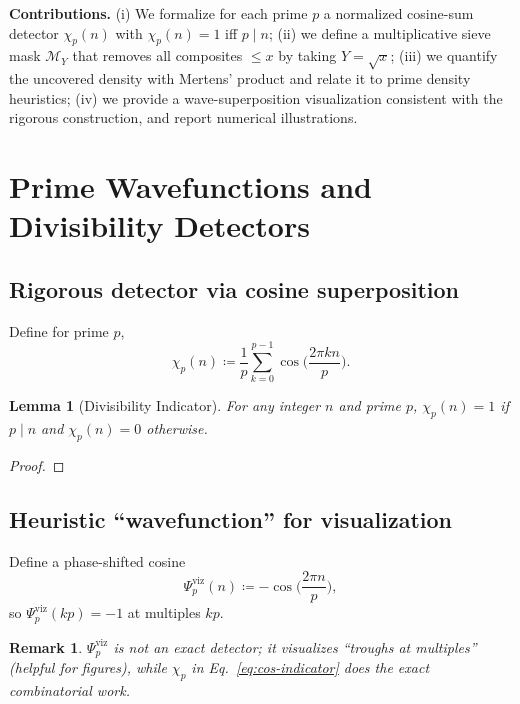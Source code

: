 \documentclass[reprint,amsmath,amssymb,aps,pra]{revtex4-2}
\newtheorem{lemma}{Lemma}
\newtheorem{remark}{Remark}
\newcommand{\W}{\Psi}                         %
\begin{document}
\textbf{Contributions.} (i) We formalize for each prime $p$ a normalized cosine-sum detector $\chi_p(n)$ with $\chi_p(n)=1$ iff $p\mid n$; (ii) we define a multiplicative sieve mask $\mathcal{M}_Y$ that removes all composites $\le x$ by taking $Y=\sqrt{x}$; (iii) we quantify the uncovered density with Mertens’ product and relate it to prime density heuristics; (iv) we provide a wave-superposition visualization consistent with the rigorous construction, and report numerical illustrations.

\section{Prime Wavefunctions and Divisibility Detectors}

\subsection{Rigorous detector via cosine superposition}
Define for prime $p$,
\begin{equation}
\chi_p(n) \coloneqq \frac{1}{p}\sum_{k=0}^{p-1}\cos\!\Big(\frac{2\pi k n}{p}\Big).
\label{eq:cos-indicator}
\end{equation}
\begin{lemma}[Divisibility Indicator]
For any integer $n$ and prime $p$, $\chi_p(n)=1$ if $p\mid n$ and $\chi_p(n)=0$ otherwise.
\end{lemma}
\begin{proof}
\end{proof}


\subsection{Heuristic “wavefunction” for visualization}
Define a phase-shifted cosine
\begin{equation}
\W^{\mathrm{viz}}_p(n) \coloneqq -\cos\!\Big(\frac{2\pi n}{p}\Big),
\label{eq:viz-wave}
\end{equation}
so $\W^{\mathrm{viz}}_p(kp)=-1$ at multiples $kp$.
\begin{remark}
$\W^{\mathrm{viz}}_p$ is \emph{not} an exact detector; it visualizes “troughs at multiples” (helpful for figures), while $\chi_p$ in Eq.~\eqref{eq:cos-indicator} does the exact combinatorial work.
\end{remark}
\end{document}
